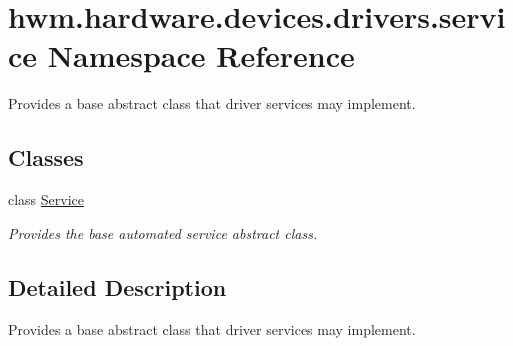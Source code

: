 \hypertarget{namespacehwm_1_1hardware_1_1devices_1_1drivers_1_1service}{\section{hwm.\-hardware.\-devices.\-drivers.\-service Namespace Reference}
\label{namespacehwm_1_1hardware_1_1devices_1_1drivers_1_1service}
}


Provides a base abstract class that driver services may implement.  


\subsection*{Classes}
\begin{DoxyCompactItemize}
\item 
class \hyperlink{classhwm_1_1hardware_1_1devices_1_1drivers_1_1service_1_1_service}{Service}
\begin{DoxyCompactList}\small\item\em Provides the base automated service abstract class. \end{DoxyCompactList}\end{DoxyCompactItemize}


\subsection{Detailed Description}
Provides a base abstract class that driver services may implement. 